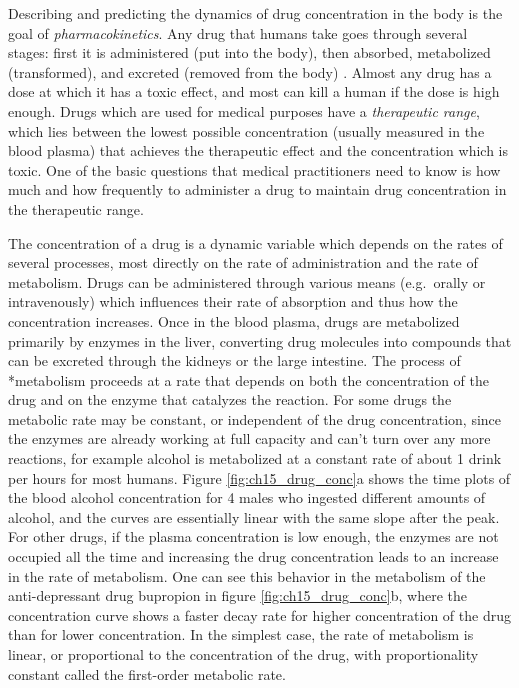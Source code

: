 \documentclass[
]{book}
\theoremstyle{definition}
\theoremstyle{definition}
\theoremstyle{definition}
\theoremstyle{remark}
\begin{document}
Describing and predicting the dynamics of drug concentration in the body is the goal of  \emph{pharmacokinetics}. Any drug that humans take goes through several stages: first it is administered (put into the body), then absorbed, metabolized (transformed), and excreted (removed from the body) \citep{rosenbaum_basic_2011}. Almost any drug has a dose at which it has a toxic effect, and most can kill a human if the dose is high enough. Drugs which are used for medical purposes have a \emph{therapeutic range}, which lies between the lowest possible concentration (usually measured in the blood plasma) that achieves the therapeutic effect and the concentration which is toxic. One of the basic questions that medical practitioners need to know is how much and how frequently to administer a drug to maintain drug concentration in the therapeutic range.

The concentration of a drug is a dynamic variable which depends on the rates of several processes, most directly on the rate of administration and the rate of metabolism. Drugs can be  administered through various means (e.g.~orally or intravenously) which influences their rate of absorption and thus how the concentration increases. Once in the blood plasma, drugs are metabolized primarily by enzymes in the liver, converting drug molecules into compounds that can be excreted through the kidneys or the large intestine. The process of  *metabolism proceeds at a rate that depends on both the concentration of the drug and on the enzyme that catalyzes the reaction. For some drugs the metabolic rate may be constant, or independent of the drug concentration, since the enzymes are already working at full capacity and can't turn over any more reactions, for example alcohol is metabolized at a constant rate of about 1 drink per hours for most humans. Figure \ref{fig:ch15_drug_conc}a shows the time plots of the blood alcohol concentration for 4 males who ingested different amounts of alcohol, and the curves are essentially linear with the same slope after the peak. For other drugs, if the plasma concentration is low enough, the enzymes are not occupied all the time and increasing the drug concentration leads to an increase in the rate of metabolism. One can see this behavior in the metabolism of the anti-depressant drug bupropion in figure \ref{fig:ch15_drug_conc}b, where the concentration curve shows a faster decay rate for higher concentration of the drug than for lower concentration. In the simplest case, the rate of metabolism is linear, or proportional to the concentration of the drug, with proportionality constant called the first-order metabolic rate.
\end{document}
